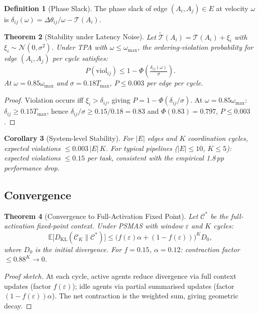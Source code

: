 \documentclass[10pt,twocolumn]{article}
\theoremstyle{plain}
\newtheorem{theorem}{Theorem}[section]
\newtheorem{corollary}[theorem]{Corollary}
\theoremstyle{definition}
\newtheorem{definition}[theorem]{Definition}
\theoremstyle{remark}
\newcommand{\Ccost}{\mathcal{C}}
\newcommand{\T}{\mathcal{T}}
\newcommand{\eps}{\varepsilon}
\newcommand{\phase}{\theta}
\newcommand{\sweepvel}{\omega}
\begin{document}
\begin{definition}[Phase Slack]
The phase slack of edge $(A_i,A_j)\in E$ at velocity $\sweepvel$ is
$\delta_{ij}(\sweepvel)=\Delta\phase_{ij}/\sweepvel - \T(A_i)$.
\end{definition}

\begin{theorem}[Stability under Latency Noise]
\label{thm:stability}
Let $\tilde{\T}(A_i)=\T(A_i)+\xi_i$ with
$\xi_i\sim\mathcal{N}(0,\sigma^2)$.  Under TPA with
$\sweepvel\leq\sweepvel_{\max}$, the ordering-violation probability
for edge $(A_i,A_j)$ per cycle satisfies:
\[
  P(\mathrm{viol}_{ij})
  \leq 1-\Phi\!\left(\tfrac{\delta_{ij}(\sweepvel)}{\sigma}\right).
\]
At $\sweepvel=0.85\sweepvel_{\max}$ and $\sigma=0.18 T_{\max}$,
$P\leq 0.003$ per edge per cycle.
\end{theorem}
\begin{proof}
Violation occurs iff $\xi_i>\delta_{ij}$, giving
$P=1-\Phi(\delta_{ij}/\sigma)$.  At $\sweepvel=0.85\sweepvel_{\max}$:
$\delta_{ij}\geq 0.15 T_{\max}$, hence
$\delta_{ij}/\sigma\geq 0.15/0.18=0.83$ and
$\Phi(0.83)=0.797$, $P\leq 0.003$.
\end{proof}

\begin{corollary}[System-level Stability]
For $|E|$ edges and $K$ coordination cycles, expected violations
$\leq 0.003\,|E|\,K$.  For typical pipelines ($|E|\leq10$, $K\leq5$):
expected violations $\leq 0.15$ per task, consistent with the
empirical 1.8\,pp performance drop.
\end{corollary}

\subsection{Convergence}

\begin{theorem}[Convergence to Full-Activation Fixed Point]
\label{thm:convergence}
Let $\Ccost^*$ be the full-activation fixed-point context.  Under
PSMAS with window $\eps$ and $K$ cycles:
\[
  \mathbb{E}\bigl[D_{\mathrm{KL}}(\Ccost_K\|\Ccost^*)\bigr]
  \leq\bigl(f(\eps)\alpha+(1{-}f(\eps))\bigr)^K D_0,
\]
where $D_0$ is the initial divergence.  For $f=0.15$, $\alpha=0.12$:
contraction factor $\leq 0.88^K\to 0$.
\end{theorem}
\begin{proof}[Proof sketch]
At each cycle, active agents reduce divergence via full context updates
(factor $f(\eps)$); idle agents via partial summarised updates (factor
$(1-f(\eps))\alpha$).  The net contraction is the weighted sum, giving
geometric decay.
\end{proof}
\end{document}
